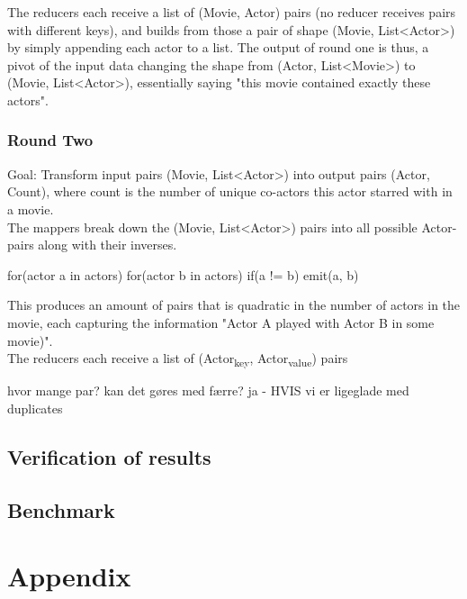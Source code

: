 \documentclass[a4paper,11pt]{article}
\begin{document}
The reducers each receive a list of (Movie, Actor) pairs (no reducer receives pairs with different keys), and builds from those a pair of shape (Movie, List<Actor>) by simply appending each actor to a list. The output of round one is thus, a pivot of the input data changing the shape from (Actor, List<Movie>) to (Movie, List<Actor>), essentially saying "this movie contained exactly these actors".

\subsubsection{Round Two}
Goal: Transform input pairs (Movie, List<Actor>) into output pairs (Actor, Count), where count is the number of unique co-actors this actor starred with in a movie.\\

The mappers break down the (Movie, List<Actor>) pairs into all possible Actor-pairs along with their inverses.

for(actor a in actors)
	for(actor b in actors)
		if(a != b)
			emit(a, b)

This produces an amount of pairs that is quadratic in the number of actors in the movie, each capturing the information "Actor A played with Actor B in some movie)".\\

The reducers each receive a list of (Actor\textsubscript{key}, Actor\textsubscript{value}) pairs



	hvor mange par?
	kan det gøres med færre?
		ja - HVIS vi er ligeglade med duplicates

\subsection{Verification of results}
\subsection{Benchmark}

\section{Appendix}
\end{document}
